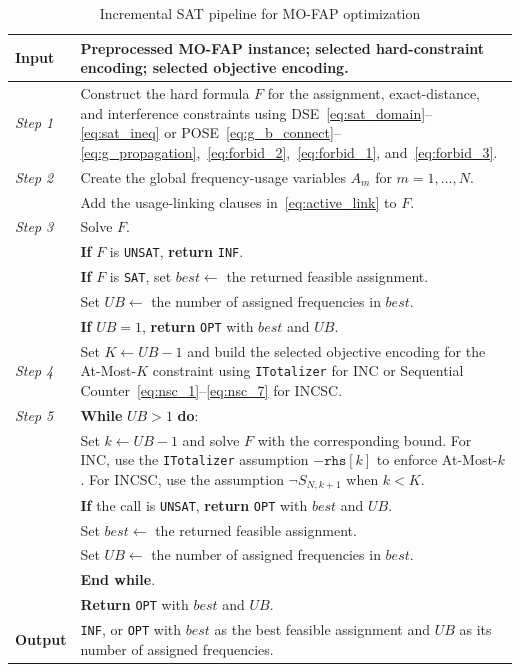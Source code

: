 \documentclass[letterpaper,journal]{IEEEtran}
\begin{document}
\begin{table}[!t]
\caption{Incremental SAT pipeline for MO-FAP optimization}
\label{tab:incremental_pipeline}
\centering
\begin{tabular}{p{} p{}}
\toprule
\textbf{Input} & Preprocessed MO-FAP instance; selected hard-constraint encoding; selected objective encoding. \\
\midrule
\textit{Step 1} & Construct the hard formula $F$ for the assignment, exact-distance, and interference constraints using DSE~\eqref{eq:sat_domain}--\eqref{eq:sat_ineq} or POSE~\eqref{eq:g_b_connect}--\eqref{eq:g_propagation},~\eqref{eq:forbid_2},~\eqref{eq:forbid_1}, and~\eqref{eq:forbid_3}. \\
\midrule
\textit{Step 2} & Create the global frequency-usage variables $A_m$ for $m=1,\ldots,N$. \\
& Add the usage-linking clauses in~\eqref{eq:active_link} to $F$. \\
\midrule
\textit{Step 3} & Solve $F$. \\
& \textbf{If} $F$ is \texttt{UNSAT}, \textbf{return} \texttt{INF}. \\
& \textbf{If} $F$ is \texttt{SAT}, set $\mathit{best}\leftarrow$ the returned feasible assignment. \\
& Set $UB\leftarrow$ the number of assigned frequencies in $\mathit{best}$. \\
& \textbf{If} $UB=1$, \textbf{return} \texttt{OPT} with $\mathit{best}$ and $UB$. \\
\midrule
\textit{Step 4} & Set $K\leftarrow UB-1$ and build the selected objective encoding for the At-Most-$K$ constraint using \texttt{ITotalizer} for INC or Sequential Counter~\eqref{eq:nsc_1}--\eqref{eq:nsc_7} for INCSC.
\\
\midrule
\textit{Step 5} & \textbf{While} $UB>1$ \textbf{do}: \\
& \quad Set $k\leftarrow UB-1$ and solve $F$ with the corresponding bound. For INC, use the \texttt{ITotalizer} assumption $-\texttt{rhs}[k]$ to enforce At-Most-$k$. For INCSC, use the assumption $\neg S_{N,k+1}$ when \(k<K\). \\
& \quad \textbf{If} the call is \texttt{UNSAT}, \textbf{return} \texttt{OPT} with $\mathit{best}$ and $UB$. \\
& \quad Set $\mathit{best}\leftarrow$ the returned feasible assignment. \\
& \quad Set $UB\leftarrow$ the number of assigned frequencies in $\mathit{best}$. \\
& \textbf{End while}. \\
& \textbf{Return} \texttt{OPT} with $\mathit{best}$ and $UB$. \\
\midrule
\textbf{Output} & \texttt{INF}, or \texttt{OPT} with $\mathit{best}$ as the best feasible assignment and $UB$ as its number of assigned frequencies. \\
\bottomrule
\end{tabular}
\end{table}
\end{document}
